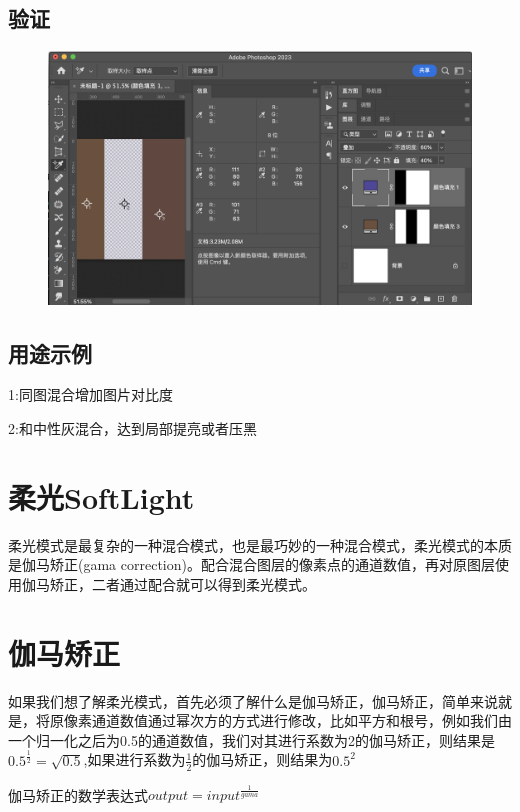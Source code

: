 \subsection{ 验证}
\begin{figure}[h!]
	\centering
	\includegraphics[width=\linewidth]{figure/overlay}
	\caption{}
	\label{fig:overlay}
\end{figure}


\subsection{ 用途示例}

1:同图混合增加图片对比度

2:和中性灰混合，达到局部提亮或者压黑

\newpage
\section{ 柔光SoftLight}

柔光模式是最复杂的一种混合模式，也是最巧妙的一种混合模式，柔光模式的本质是伽马矫正(gama correction)。配合混合图层的像素点的通道数值，再对原图层使用伽马矫正，二者通过配合就可以得到柔光模式。
\section{伽马矫正}
	 如果我们想了解柔光模式，首先必须了解什么是伽马矫正，伽马矫正，简单来说就是，将原像素通道数值通过幂次方的方式进行修改，比如平方和根号，例如我们由一个归一化之后为0.5的通道数值，我们对其进行系数为2的伽马矫正，则结果是$0.5^{\frac{1}{2}}=\sqrt{0.5}$,如果进行系数为$\frac{1}{2}$的伽马矫正，则结果为$0.5^2$

伽马矫正的数学表达式$output = input^{\frac{1}{gama}}$

